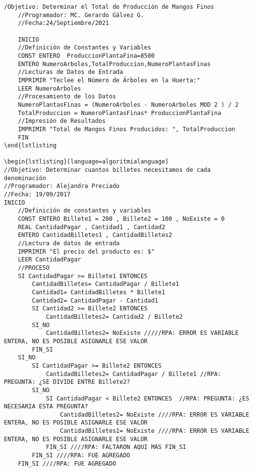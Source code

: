 \documentclass{beamer}
\begin{document}
\begin{frame}[fragile] %

\begin{lstlisting}[language=algoritmialanguage]
	/Objetivo: Determinar el Total de Producción de Mangos Finos
	//Programador: MC. Gerardo Gálvez G.
	//Fecha:24/Septiembre/2021
	
	INICIO
	//Definición de Constantes y Variables 
	CONST ENTERO  ProduccionPlantaFina=8500
	ENTERO NumeroArboles,TotalProduccion,NumeroPlantasFinas	
	//Lecturas de Datos de Entrada
	IMPRIMIR "Teclee el Número de Árboles en la Huerta:"
	LEER NumeroArboles
	//Procesamiento de los Datos
	NumeroPlantasFinas = (NumeroArboles - NumeroArboles MOD 2 ) / 2  
	TotalProduccion = NumeroPlantasFinas* ProduccionPlantaFina
	//Impresión de Resultados
	IMPRIMIR "Total de Mangos Finos Producidos: ", TotalProduccion
	FIN
\end{lstlisting

\begin{lstlisting}[language=algoritmialanguage]
//Objetivo: Determinar cuantos billetes necesitamos de cada denominación
//Programador: Alejandra Preciado
//Fecha: 19/09/2017
INICIO
	//Definición de constantes y variables
	CONST ENTERO Billete1 = 200 , Billete2 = 100 , NoExiste = 0
	REAL CantidadPagar , Cantidad1 , Cantidad2
	ENTERO CantidadBilletes1 , CantidadBilletes2 
	//Lectura de datos de entrada
	IMPRIMIR "El precio del producto es: $"
	LEER CantidadPagar
	//PROCESO
	SI CantidadPagar >= Billete1 ENTONCES
		CantidadBilletes= CantidadPagar / Billete1
		Cantidad1= CantidadBilletes * Billete1
		Cantidad2= CantidadPagar - Cantidad1
		SI Cantidad2 >= Billete2 ENTONCES
			CantidadBilletes2= Cantidad2 / Billete2
		SI_NO
			CantidadBilletes2= NoExiste /////RPA: ERROR ES VARIABLE ENTERA, NO ES POSIBLE ASIGNARLE ESE VALOR
		FIN_SI
	SI_NO   
		SI CantidadPagar >= Billete2 ENTONCES
			CantidadBilletes2= CantidadPagar / Billete1 //RPA: PREGUNTA: ¿SE DIVIDE ENTRE Billete2?
		SI_NO
			SI CantidadPagar < Billete2 ENTONCES  //RPA: PREGUNTA: ¿ES NECESARIA ESTA PREGUNTA? 
				CantidadBilletes2= NoExiste ////RPA: ERROR ES VARIABLE ENTERA, NO ES POSIBLE ASIGNARLE ESE VALOR
				CantidadBilletes1= NoExiste ////RPA: ERROR ES VARIABLE ENTERA, NO ES POSIBLE ASIGNARLE ESE VALOR
			FIN_SI ////RPA: FALTARON AQUI MÁS FIN_SI
		FIN_SI ////RPA: FUE AGREGADO
	FIN_SI ////RPA: FUE AGREGADO
\end{lstlisting}
\end{frame}
\end{document}

